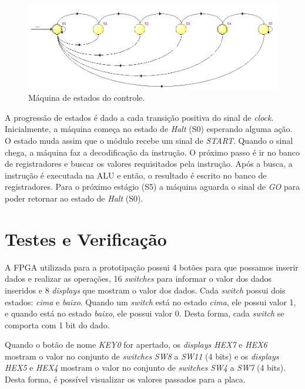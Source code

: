 \documentclass[11pt,a4paper,titlepage]{article}
\begin{document}
\begin{figure}[h]
\centering
\includegraphics[scale=0.4]{images/StateMachine.png}
\caption{Máquina de estados do controle.}
\label{fig:statemachine}
\end{figure}

A progressão de estados é dado a cada transição positiva do sinal de \textit{clock}. Inicialmente, a máquina começa no estado de \textit{Halt} (S0) esperando alguma ação. O estado muda assim que o módulo recebe um sinal de \textit{START}. Quando o sinal chega, a máquina faz a decodificação da instrução. O próximo passo é ir no banco de registradores e buscar os valores requisitados pela instrução. Após a busca, a instrução é executada na ALU e então, o resultado é escrito no banco de registradores. Para o próximo estágio (S5) a máquina aguarda o sinal de \textit{GO} para poder retornar ao estado de \textit{Halt} (S0).

\section{Testes e Verificação}

A FPGA utilizada para a prototipação possui 4 botões para que possamos inserir dados e realizar as operações, 16 \textit{switches} para informar o valor dos dados inseridos e 8 \textit{displays} que mostram o valor dos dados.
Cada \textit{switch} possui dois estados: \textit{cima} e \textit{baixo}.
Quando um \textit{switch} está no estado \textit{cima}, ele possui valor 1, e quando está no estado \textit{baixo}, ele possui valor 0.
Desta forma, cada \textit{switch} se comporta com 1 bit do dado.

Quando o botão de nome \textit{KEY0} for apertado, os \textit{displays HEX7} e \textit{HEX6} mostram o valor no conjunto de \textit{switches} \textit{SW8} a \textit{SW11} (4 bits) e os \textit{displays HEX5} e \textit{HEX4} mostram o valor no conjunto de \textit{switches} \textit{SW4} a \textit{SW7} (4 bits).
Desta forma, é possível visualizar os valores passados para a placa.
\end{document}
